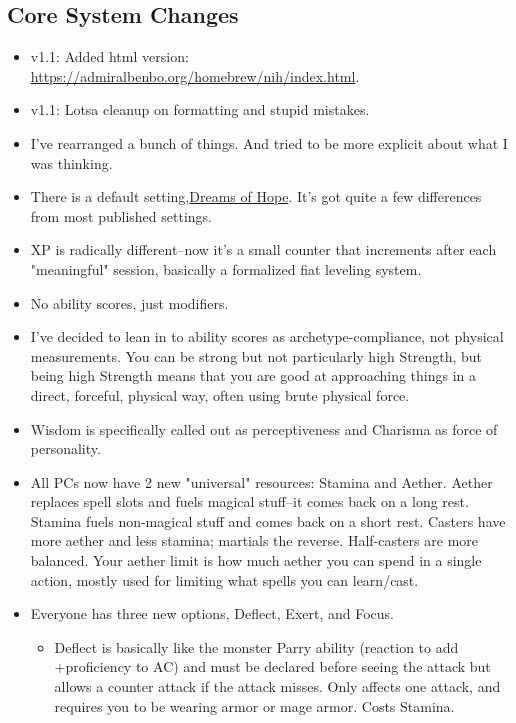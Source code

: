 \subsection*{Core System Changes}
\begin{itemize}
    \item v1.1: Added html version: \href{https://admiralbenbo.org/homebrew/nih/index.html}{https://admiralbenbo.org/homebrew/nih/index.html}.
    \item v1.1: Lotsa cleanup on formatting and stupid mistakes.
    \item I've rearranged a bunch of things. And tried to be more explicit about what I was thinking.
    \item There is a default setting,\href{https://wiki.admiralbenbo.org}{Dreams of Hope}. It's got quite a few differences from most published settings.
    \item XP is radically different--now it's a small counter that increments after each "meaningful" session, basically a formalized fiat leveling system.
    \item No ability scores, just modifiers.
    \item I've decided to lean in to ability scores as archetype-compliance, not physical measurements. You can be strong but not particularly high Strength, but being high Strength means that you are good at approaching things in a direct, forceful, physical way, often using brute physical force.
    \item Wisdom is specifically called out as perceptiveness and Charisma as force of personality.
    \item All PCs now have 2 new "universal" resources: Stamina and Aether. Aether replaces spell slots and fuels magical stuff--it comes back on a long rest. Stamina fuels non-magical stuff and comes back on a short rest. Casters have more aether and less stamina; martials the reverse. Half-casters are more balanced. Your aether limit is how much aether you can spend in a single action, mostly used for limiting what spells you can learn/cast.
    \item Everyone has three new options, Deflect, Exert, and Focus. 
    \begin{itemize}
        \item Deflect is basically like the monster Parry ability (reaction to add +proficiency to AC) and must be declared before seeing the attack but allows a counter attack if the attack misses. Only affects one attack, and requires you to be wearing armor or mage armor. Costs Stamina.

\end{itemize}
\end{itemize}
